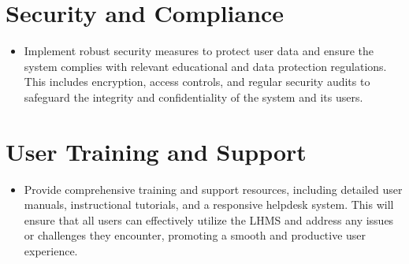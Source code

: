 \documentclass[12pt]{article}
\begin{document}
\section*{Security and Compliance}

\begin{itemize}
    \item Implement robust security measures to protect user data and ensure the system complies with relevant educational and data protection regulations. This includes encryption, access controls, and regular security audits to safeguard the integrity and confidentiality of the system and its users.
\end{itemize}

\section*{User Training and Support}

\begin{itemize}
    \item Provide comprehensive training and support resources, including detailed user manuals, instructional tutorials, and a responsive helpdesk system. This will ensure that all users can effectively utilize the LHMS and address any issues or challenges they encounter, promoting a smooth and productive user experience.
\end{itemize}
\end{document}
